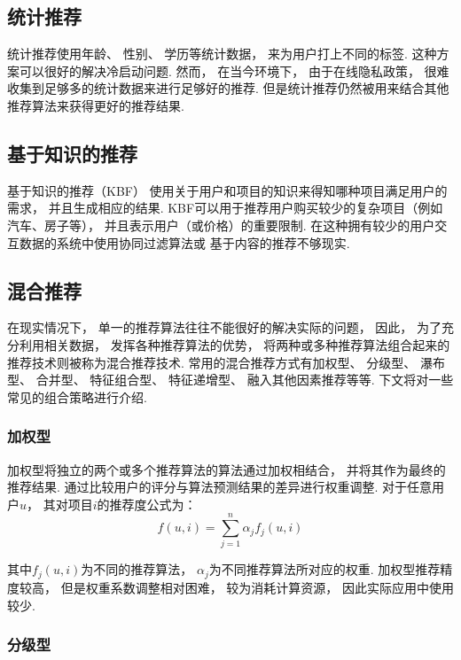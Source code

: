\subsection{统计推荐}

统计推荐使用年龄、
性别、
学历等统计数据，
来为用户打上不同的标签.
这种方案可以很好的解决冷启动问题.
然而，
在当今环境下，
由于在线隐私政策，
很难收集到足够多的统计数据来进行足够好的推荐.
但是统计推荐仍然被用来结合其他推荐算法来获得更好的推荐结果.

\subsection{基于知识的推荐}

基于知识的推荐（KBF）
使用关于用户和项目的知识来得知哪种项目满足用户的需求，
并且生成相应的结果\cite{burkeKnowledgeBasedRecommenderSystems2000}.
KBF可以用于推荐用户购买较少的复杂项目（例如汽车、房子等），
并且表示用户（或价格）的重要限制\cite{felfernigConstraintbasedRecommenderSystems2008}.
在这种拥有较少的用户交互数据的系统中使用协同过滤算法或
基于内容的推荐不够现实.

\subsection{混合推荐}

在现实情况下，
单一的推荐算法往往不能很好的解决实际的问题，
因此，
为了充分利用相关数据，
发挥各种推荐算法的优势，
将两种或多种推荐算法组合起来的推荐技术则被称为混合推荐技术.
常用的混合推荐方式有加权型、
分级型、
瀑布型、
合并型、
特征组合型、
特征递增型、
融入其他因素推荐等等.
下文将对一些常见的组合策略进行介绍\cite{heJiYuJuanJiShenJingWangLuoDeYinLeTuiJianXiTong2019}.

\subsubsection{加权型}

加权型将独立的两个或多个推荐算法的算法通过加权相结合，
并将其作为最终的推荐结果.
通过比较用户的评分与算法预测结果的差异进行权重调整.
对于任意用户$u$，
其对项目$i$的推荐度公式为：
\begin{equation}
    f(u,i)=\sum_{j=1}^n\alpha_j f_j(u,i)
\end{equation}

其中$f_j(u,i)$为不同的推荐算法，
$\alpha_j$为不同推荐算法所对应的权重.
加权型推荐精度较高，
但是权重系数调整相对困难，
较为消耗计算资源，
因此实际应用中使用较少.

\subsubsection{分级型}

